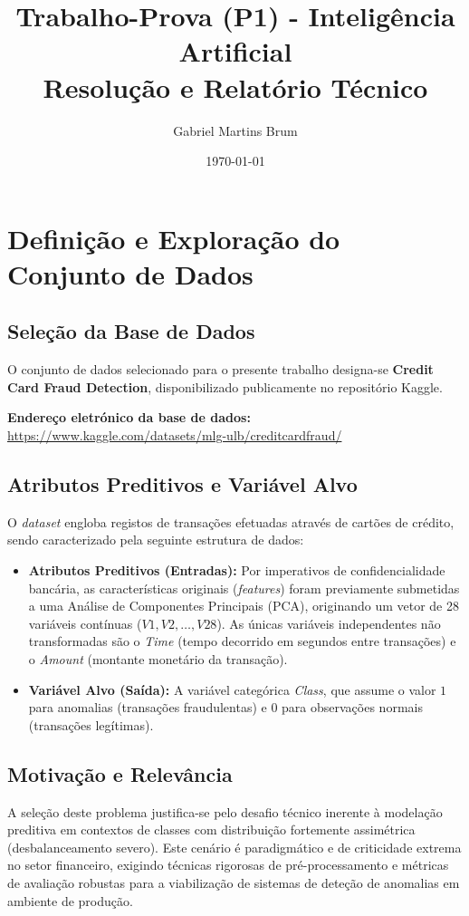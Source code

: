 \documentclass[12pt,a4paper]{article}
\title{Trabalho-Prova (P1) - Inteligência Artificial \\ \large Resolução e Relatório Técnico}
\author{Gabriel Martins Brum}
\date{\today}
\begin{document}
\maketitle

\tableofcontents
\newpage

\section{Definição e Exploração do Conjunto de Dados}

\subsection{Seleção da Base de Dados}
O conjunto de dados selecionado para o presente trabalho designa-se \textbf{Credit Card Fraud Detection}, disponibilizado publicamente no repositório Kaggle.

\textbf{Endereço eletrónico da base de dados:} \url{https://www.kaggle.com/datasets/mlg-ulb/creditcardfraud/}

\subsection{Atributos Preditivos e Variável Alvo}
O \textit{dataset} engloba registos de transações efetuadas através de cartões de crédito, sendo caracterizado pela seguinte estrutura de dados:
\begin{itemize}
    \item \textbf{Atributos Preditivos (Entradas):} Por imperativos de confidencialidade bancária, as características originais (\textit{features}) foram previamente submetidas a uma Análise de Componentes Principais (PCA), originando um vetor de 28 variáveis contínuas ($V1, V2, \dots, V28$). As únicas variáveis independentes não transformadas são o \textit{Time} (tempo decorrido em segundos entre transações) e o \textit{Amount} (montante monetário da transação).
    \item \textbf{Variável Alvo (Saída):} A variável categórica \textit{Class}, que assume o valor $1$ para anomalias (transações fraudulentas) e $0$ para observações normais (transações legítimas).
\end{itemize}

\subsection{Motivação e Relevância}
A seleção deste problema justifica-se pelo desafio técnico inerente à modelação preditiva em contextos de classes com distribuição fortemente assimétrica (desbalanceamento severo). Este cenário é paradigmático e de criticidade extrema no setor financeiro, exigindo técnicas rigorosas de pré-processamento e métricas de avaliação robustas para a viabilização de sistemas de deteção de anomalias em ambiente de produção.
\end{document}
